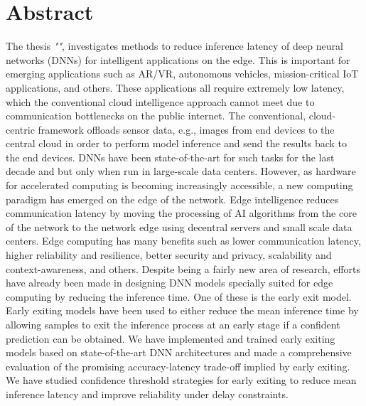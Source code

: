 
\hypertarget{abstract}{%
	\chapter*{Abstract}\label{sec:abstract}}
\begin{justify}
	\begin{small}
		{\textcolor{caption-color}{The thesis \textit{"\thetitle"}, investigates methods to reduce inference latency of deep neural networks (DNNs) for intelligent applications on the edge. This is important for emerging applications such as AR/VR, autonomous vehicles, mission-critical IoT applications, and others. These applications all require extremely low latency, which the conventional cloud intelligence approach cannot meet due to communication bottlenecks on the public internet. \newline
				The conventional, cloud-centric framework offloads sensor data, e.g., images from end devices to the central cloud in order to perform model inference and send the results back to the end devices. DNNs have been state-of-the-art for such tasks for the last decade and but only when run in large-scale data centers. However, as hardware for accelerated computing is becoming increasingly accessible, a new computing paradigm has emerged on the edge of the network.
				\newline Edge intelligence reduces communication latency by moving the processing of AI algorithms from the core of the network to the network edge using decentral servers and small scale data centers. Edge computing has many benefits such as lower communication latency, higher reliability and resilience, better security and privacy, scalability and context-awareness, and others. Despite being a fairly new area of research, efforts have already been made in designing DNN models specially suited for edge computing by reducing the inference time. One of these is the early exit model. 
				\newline Early exiting models have been used to either reduce the mean inference time by allowing samples to exit the inference process at an early stage if a confident prediction can be obtained. We have implemented and trained early exiting models based on state-of-the-art DNN architectures and made a comprehensive evaluation of the promising accuracy-latency trade-off implied by early exiting. We have studied confidence threshold strategies for early exiting to reduce mean inference latency and improve reliability under delay constraints. 
				\newline
}}
\end{small}
\end{justify}
